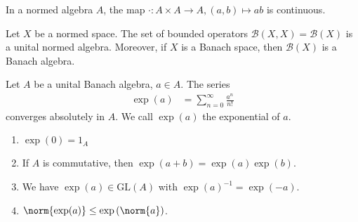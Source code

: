 \documentclass[10pt]{mypackage}
\begin{document}
\begin{lemma}
  In a normed algebra $A$, the map $\cdot: A\times A \rightarrow A,(a,b)\mapsto ab$ is continuous.
\end{lemma}
\begin{proposition}
  Let $X$ be a normed space. The set of bounded operators $\mathcal{B}\left(X,X\right) = \mathcal{B}(X)$ is a unital normed algebra. Moreover, if $X$ is a Banach space, then $\mathcal{B}\left(X\right)$ is a Banach algebra.
\end{proposition}
\begin{proposition}
  Let $A$ be a unital Banach algebra, $a\in A$. The series
  \begin{align*}
    \exp(a) &= \sum_{n=0}^{\infty}\frac{a^n}{n!}
  \end{align*}
  converges absolutely in $A$. We call $\exp(a) $ the exponential of $a$.
  \begin{enumerate}[(1)]
    \item $\exp(0) = 1_A$
    \item If $A$ is commutative, then $\exp(a+b) = \exp(a)\exp(b)$.
    \item We have $\exp(a)\in \text{GL}(A)$ with $\exp(a)^{-1} = \exp(-a)$.
    \item $\norm{\exp(a)}\leq \exp\left(\norm{a}\right)$.
  \end{enumerate}
\end{proposition}
\end{document}
